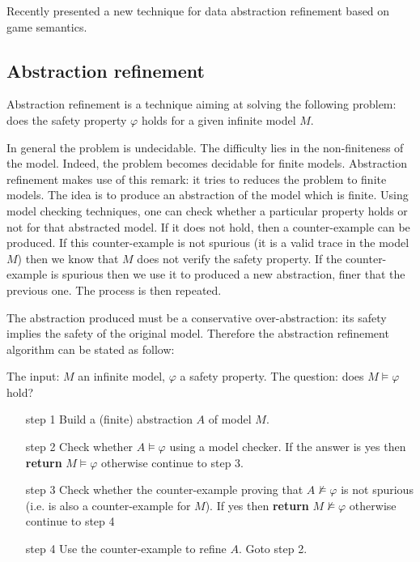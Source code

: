 Recently \citeauthor{DBLP:conf/sas/DimovskiGL05} presented
\citep{DBLP:conf/sas/DimovskiGL05} a new technique for data
abstraction refinement based on game semantics.

\subsection{Abstraction refinement}

Abstraction refinement is a technique aiming at solving the
following problem: does the safety property $\varphi$ holds for a
given infinite model $M$.

In general the problem is undecidable. The difficulty lies in the
non-finiteness of the model. Indeed, the problem becomes decidable
for finite models. Abstraction refinement makes use of this remark:
it tries to reduces the problem to finite models. The idea is to
produce an abstraction of the model which is finite. Using model
checking techniques, one can check whether a particular property
holds or not for that abstracted model. If it does not hold, then a
counter-example can be produced. If this counter-example is not
spurious (it is a valid trace in the model $M$) then we know that
$M$ does not verify the safety property. If the counter-example is
spurious then we use it to produced a new abstraction, finer that
the previous one. The process is then repeated.

The abstraction produced must be a conservative over-abstraction:
its safety implies the safety of the original model. Therefore the
abstraction refinement algorithm can be stated as follow:

\begin{algo}
The input: $M$ an infinite model, $\varphi$ a safety property. The
question: does $M \models \varphi$ hold?
\begin{enumerate}
\item[step 1] Build a (finite) abstraction $A$ of model $M$.
\item[step 2] Check whether $A \models \varphi$ using a model
checker. If the answer is yes then \textbf{return} $M \models
\varphi$ otherwise continue to step 3.

\item[step 3] Check whether the counter-example proving that $A \not \models
\varphi$ is not spurious (i.e. is also a counter-example for $M$).
If yes then \textbf{return} $M \not\models \varphi$ otherwise
continue to step 4

\item[step 4] Use the counter-example to refine $A$. Goto step 2.
\end{enumerate}
\end{algo}

